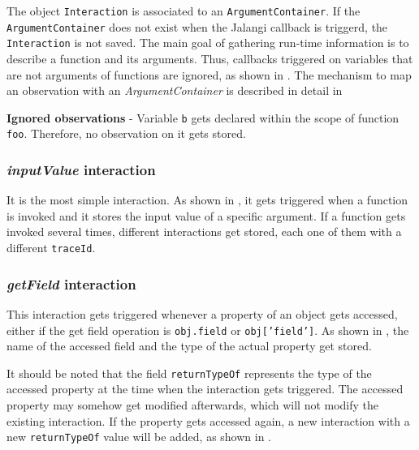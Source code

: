 The object \texttt{Interaction} is associated to an \texttt{ArgumentContainer}. If the \texttt{ArgumentContainer} does not exist when the Jalangi callback is triggerd, the \texttt{Interaction} is not saved. The main goal of gathering run-time information is to describe a function and its arguments. Thus, callbacks triggered on variables that are not arguments of functions are ignored, as shown in . The mechanism to map an observation with an \textit{ArgumentContainer} is described in detail in 

\begin{code}
  \caption[Ignored observations]{\textbf{Ignored observations} - Variable \texttt{b} gets declared within the scope of function \texttt{foo}. Therefore, no observation on it gets stored.}
  \label{code:ignored-observations}
\end{code}

\subsubsection{\textit{inputValue} interaction}
It is the most simple interaction. As shown in , it gets triggered when a function is invoked and it stores the input value of a specific argument. If a function gets invoked several times, different interactions get stored, each one of them with a different \texttt{traceId}.



\subsubsection{\textit{getField} interaction}
This interaction gets triggered whenever a property of an object gets accessed, either if the get field operation is \texttt{obj.field} or \texttt{obj['field']}. As shown in , the name of the accessed field and the type of the actual property get stored.

It should be noted that the field \texttt{returnTypeOf} represents the type of the accessed property at the time when the interaction gets triggered. The accessed property may somehow get modified afterwards, which will not modify the existing interaction. If the property gets accessed again, a new interaction with a new \texttt{returnTypeOf} value will be added, as shown in .

